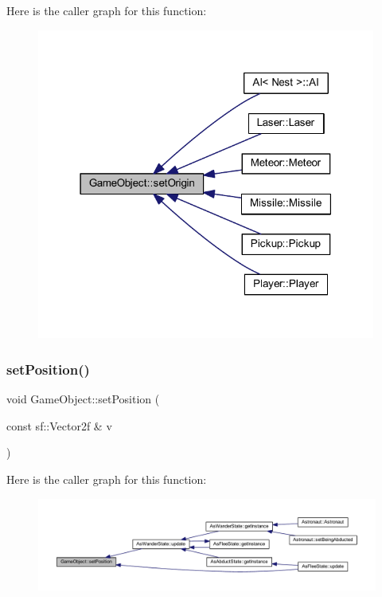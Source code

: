 Here is the caller graph for this function\+:
\nopagebreak
\begin{figure}[H]
\begin{center}
\leavevmode
\includegraphics[width=316pt]{class_game_object_a939b26e569a42ec129e57540920e859c_icgraph}
\end{center}
\end{figure}
\mbox{\label{class_game_object_acdd88174ec97a4fae78b039762a39726}} 
\subsubsection{\texorpdfstring{set\+Position()}{setPosition()}}
{\footnotesize\ttfamily void Game\+Object\+::set\+Position (\begin{DoxyParamCaption}\item[{const sf\+::\+Vector2f \&}]{v }\end{DoxyParamCaption})}

Here is the caller graph for this function\+:
\nopagebreak
\begin{figure}[H]
\begin{center}
\leavevmode
\includegraphics[width=350pt]{class_game_object_acdd88174ec97a4fae78b039762a39726_icgraph}
\end{center}
\end{figure}
\mbox{\label{class_game_object_a6231b29f94ab90ff5cd3629b527caec1}} 
